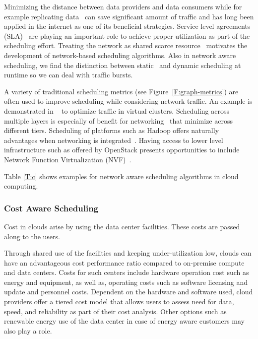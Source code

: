 \documentclass[final,5p,times,twocolumn]{elsarticle}
\newcommand{\TODO}[1]{\todo[inline]{#1}}
\begin{document}
Minimizing the distance between data providers and data
consumers while for example replicating data~\cite{www-akamai} can save
significant amount of traffic and has long been applied in the
internet as one of its beneficial strategies. Service level agreements
(SLA)~\cite{breitgand2012improving} are playing an important role to
achieve proper utilization as part of the scheduling effort. Treating
the network as shared scarce resource~\cite{rampersaud2016sharing}
motivates the development of network-based scheduling algorithms.
Also in network aware scheduling, we find the
distinction between static~\cite{biran2012stable} and dynamic
scheduling at runtime so we can deal with traffic bursts.

\TODO{THIS FIGURE IS MISSING}

A variety of traditional scheduling metrics (see
Figure~\ref{F:graph-metrics}) are often used to improve scheduling
while considering network traffic. An example is demonstrated in
~\cite{yu2017survivable} to optimize traffic in virtual clusters.
Scheduling across multiple layers is especially of benefit for
networking~\cite{bi2015sla} that minimize across different tiers.
Scheduling of platforms such as Hadoop offers naturally advantages
when networking is integrated~\cite{kondikoppa2012network}.  Having
access to lower level infrastructure such as offered by OpenStack
presents opportunities to include Network Function Virtualization
(NVF)~\cite{lucrezia2015introducing}.

Table \ref{T:c} shows examples for network aware scheduling algorithms
in cloud computing.



%


\subsubsection{Cost Aware Scheduling}\label{sec:cost}


Cost in clouds arise by using the data center facilities. These costs
are passed along to the users.

Through shared use of the facilities and keeping under-utilization
low, clouds can have an advantageous cost performance ratio compared
to on-premise compute and data centers. Costs for such centers include
hardware operation cost such as energy and equipment, as well as,
operating costs such as software licensing and update and personnel
costs. Dependent on the hardware and software used, cloud providers
offer a tiered cost model that allows users to assess need for data,
speed, and reliability as part of their cost analysis.  Other options
such as renewable energy use of the data center in case of energy
aware customers may also play a role.
\end{document}
